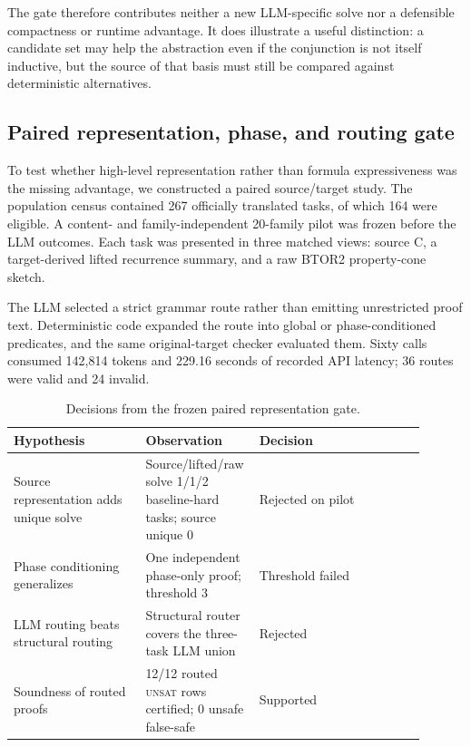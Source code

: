 \documentclass[10pt]{article}
\newcommand{\btor}{\textsc{BTOR2}}
\newcommand{\unsat}{\textsc{unsat}}
\begin{document}
The gate therefore contributes neither a new LLM-specific solve nor a
defensible compactness or runtime advantage.  It does illustrate a useful
distinction: a candidate set may help the abstraction even if the conjunction
is not itself inductive, but the source of that basis must still be compared
against deterministic alternatives.

\subsection{Paired representation, phase, and routing gate}

To test whether high-level representation rather than formula expressiveness
was the missing advantage, we constructed a paired source/target study.  The
population census contained 267 officially translated tasks, of which 164
were eligible.  A content- and family-independent 20-family pilot was frozen
before the LLM outcomes.  Each task was presented in three matched views:
source C, a target-derived lifted recurrence summary, and a raw \btor{}
property-cone sketch.

The LLM selected a strict grammar route rather than emitting unrestricted proof
text.  Deterministic code expanded the route into global or phase-conditioned
predicates, and the same original-target checker evaluated them.  Sixty calls
consumed 142,814 tokens and 229.16 seconds of recorded API latency; 36 routes
were valid and 24 invalid.

\begin{table}[t]
\centering
\caption{Decisions from the frozen paired representation gate.}
\label{tab:representation}
\small
\begin{tabular}{p{0.31\linewidth}p{0.20\linewidth}p{0.39\linewidth}}
\toprule
Hypothesis & Observation & Decision \\
\midrule
Source representation adds unique solve & Source/lifted/raw solve 1/1/2 baseline-hard tasks; source unique 0 & Rejected on pilot \\
Phase conditioning generalizes & One independent phase-only proof; threshold 3 & Threshold failed \\
LLM routing beats structural routing & Structural router covers the three-task LLM union & Rejected \\
Soundness of routed proofs & 12/12 routed \unsat{} rows certified; 0 unsafe false-safe & Supported \\
\bottomrule
\end{tabular}
\end{table}
\end{document}
